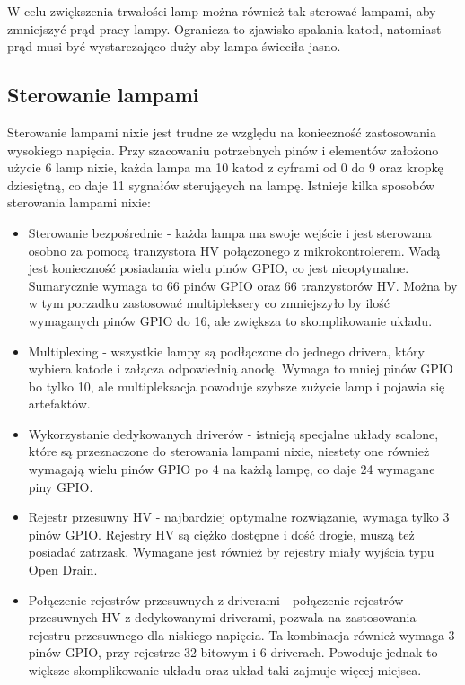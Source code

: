 \documentclass[../main.tex]{subfiles}
\begin{document}
W celu zwiększenia trwałości lamp można również tak sterować lampami, aby zmniejszyć prąd pracy lampy. Ogranicza to
 zjawisko spalania katod, natomiast prąd musi być wystarczająco duży aby lampa świeciła jasno.

\newpage

\subsection{Sterowanie lampami}
\label{sec:sterownie_lampi}

Sterowanie lampami nixie jest trudne ze względu na konieczność zastosowania wysokiego napięcia.
Przy szacowaniu potrzebnych pinów i elementów założono użycie 6 lamp nixie, każda lampa ma 10 katod z cyframi od 0 do 9 oraz 
kropkę dziesiętną, co daje 11 sygnałów sterujących na lampę.
Istnieje kilka sposobów sterowania lampami nixie\cite{st:nixie1}:

\begin{itemize}
    \item Sterowanie bezpośrednie - każda lampa ma swoje wejście i jest sterowana osobno za pomocą tranzystora HV połączonego z mikrokontrolerem.
    Wadą jest konieczność posiadania wielu pinów GPIO, co jest nieoptymalne. Sumarycznie wymaga to 66 pinów GPIO oraz 66 tranzystorów HV.
    Można by w tym porzadku zastosować multipleksery co zmniejszyło by ilość wymaganych pinów GPIO do 16, ale zwiększa to skomplikowanie układu.
    \item Multiplexing - wszystkie lampy są podłączone do jednego drivera, który wybiera katode i załącza odpowiednią anodę. 
    Wymaga to mniej pinów GPIO bo tylko 10, ale multipleksacja powoduje szybsze zużycie lamp i pojawia się artefaktów.
    \item Wykorzystanie dedykowanych driverów - istnieją specjalne układy scalone, które są przeznaczone do sterowania lampami nixie, niestety
    one również wymagają wielu pinów GPIO po 4 na każdą lampę, co daje 24 wymagane piny GPIO.
    \item Rejestr przesuwny HV - najbardziej optymalne rozwiązanie, wymaga tylko 3 pinów GPIO. Rejestry HV są ciężko dostępne i dość drogie,
    muszą też posiadać zatrzask. Wymagane jest również by rejestry miały wyjścia typu Open Drain.
    \item Połączenie rejestrów przesuwnych z driverami - połączenie rejestrów przesuwnych HV z dedykowanymi driverami, pozwala na zastosowania
    rejestru przesuwnego dla niskiego napięcia. Ta kombinacja również wymaga 3 pinów GPIO, przy rejestrze 32 bitowym i 6 driverach. Powoduje jednak to
    większe skomplikowanie układu oraz układ taki zajmuje więcej miejsca.
\end{itemize}
\end{document}
